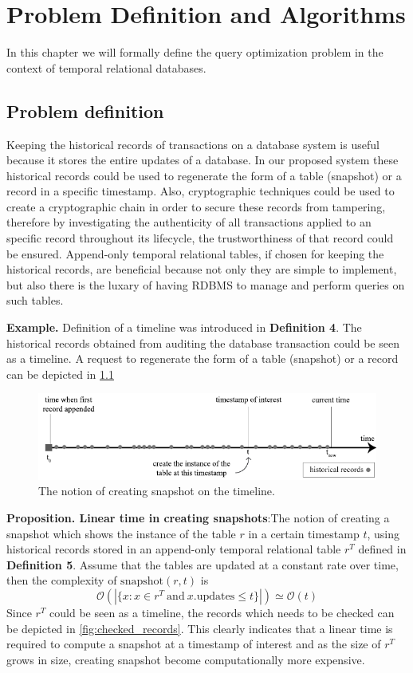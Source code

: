 \chapter{Problem Definition and Algorithms}

In this chapter we will formally define the query optimization problem in the
context of temporal relational databases.

\section{Problem definition}
Keeping the historical records of transactions on a database system is useful because it stores the entire updates of a database. In our proposed system these historical records could be used to regenerate the form of a table (snapshot) or a record in a specific timestamp. Also, cryptographic techniques could be used to create a cryptographic chain in order to secure these records from tampering, therefore by investigating the authenticity of all transactions applied to an specific record throughout its lifecycle, the trustworthiness of that record could be ensured. Append-only temporal relational tables, if chosen for keeping the historical records, are beneficial because not only they are simple to implement, but also there is the luxary of having RDBMS to manage and perform queries on such tables.

\textbf{Example.} Definition of a timeline was introduced in \textbf{Definition 4}. The historical records obtained from auditing the database transaction could be seen as a timeline. A request to regenerate the form of a table (snapshot) or a record can be depicted in \ref{fig:snapshot_notion}

\begin{figure}
	\label{fig:snapshot_notion}
	\centering
	\includegraphics[width=\textwidth]{figs/snapshot_notion.pdf}
	\caption{The notion of creating snapshot on the timeline.}
\end{figure}


\textbf{Proposition. Linear time in creating snapshots}:The notion of creating a snapshot which shows the instance of the table $r$ in a certain timestamp $t$, using historical records stored in an append-only temporal relational table $r^T$ defined in \textbf{Definition 5}. Assume that the tables are updated at a constant rate over time, then the complexity of $\mathrm{snapshot}(r, t)$ is $$\mathcal{O}(|\{x: x\in r^T\mathrm{\ and\ } x.\mathrm{updates} \leq t\}|)\simeq \mathcal{O}(t)$$
Since $r^T$ could be seen as a timeline, the records which needs to be checked can be depicted in \ref{fig:checked_records}. This clearly indicates that a linear time is required to compute a snapshot at a timestamp of interest and as the size of $r^T$ grows in size, creating snapshot become computationally more expensive.

